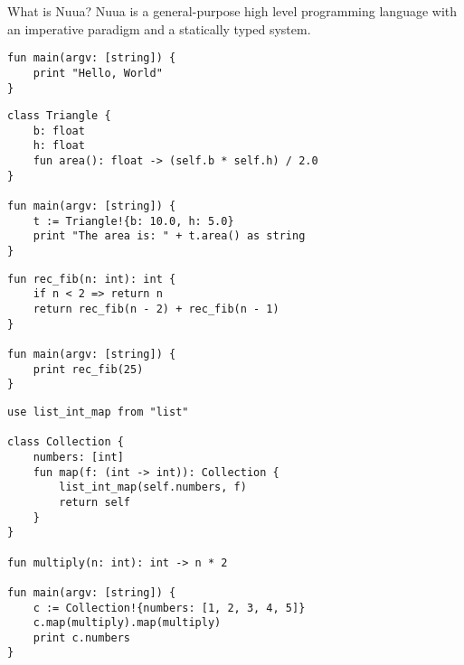 \begin{slide}
    \begin{block}{What is Nuua?}
        Nuua is a general-purpose high level programming language with an imperative paradigm and a statically typed system.
    \end{block}
    \vfill
    \begin{verbatim}
fun main(argv: [string]) {
    print "Hello, World"
}
    \end{verbatim}
\end{slide}
\begin{slide}
    \begin{verbatim}
class Triangle {
    b: float
    h: float
    fun area(): float -> (self.b * self.h) / 2.0
}

fun main(argv: [string]) {
    t := Triangle!{b: 10.0, h: 5.0}
    print "The area is: " + t.area() as string
}
    \end{verbatim}
\end{slide}
\begin{slide}
    \begin{verbatim}
fun rec_fib(n: int): int {
    if n < 2 => return n
    return rec_fib(n - 2) + rec_fib(n - 1)
}

fun main(argv: [string]) {
    print rec_fib(25)
}
    \end{verbatim}
\end{slide}
\begin{slide}
    \begin{verbatim}
use list_int_map from "list"

class Collection {
    numbers: [int]
    fun map(f: (int -> int)): Collection {
        list_int_map(self.numbers, f)
        return self
    }
}

fun multiply(n: int): int -> n * 2

fun main(argv: [string]) {
    c := Collection!{numbers: [1, 2, 3, 4, 5]}
    c.map(multiply).map(multiply)
    print c.numbers
}
    \end{verbatim}
\end{slide}
